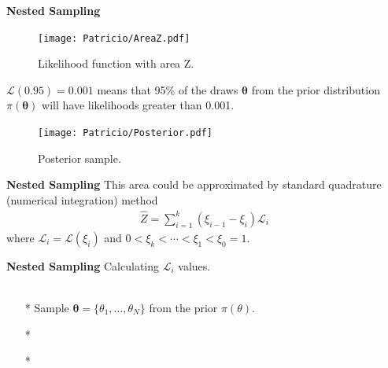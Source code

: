 \begin{frame}{\small{\textbf{Nested Sampling}}}
\begin{overprint}
	\begin{figure}
		\texttt{[image: Patricio/AreaZ.pdf]}
	\caption{Likelihood function with area Z.}
	\end{figure}
	$\mathcal L (0.95) = 0.001$ means that 95\% of the draws $\bm\theta$ from the prior distribution $\pi(\bm\theta)$ will have likelihoods greater than 0.001.		
\begin{figure}
	\texttt{[image: Patricio/Posterior.pdf]}
	\caption{Posterior sample.}
\end{figure}	
\end{overprint}
\end{frame}
\begin{frame}{\small{\textbf{Nested Sampling}}}
This area could be approximated by standard quadrature (numerical integration) method 
\begin{align*}
\widehat{Z} = \sum_{i=1}^{k}(\xi_{i-1}-\xi_{i}) \mathcal L_{i}
\end{align*}
where $\mathcal L_{i}= \mathcal L (\xi_{i})$ and $0<\xi_k<\cdots<\xi_{1}<\xi_{0}=1$.
\end{frame}
\begin{frame}{\small{\textbf{Nested Sampling}}}
Calculating $\mathcal L_{i}$ values. \\~\\

\begin{itemize}
	\item [*] Sample $\bm\theta=\{\theta_{1}, \ldots , \theta_{N}\}$ from the prior $\pi(\theta)$.
	\item [*] 
	\item [*] 
\end{itemize}

\\~\\

\end{frame}
